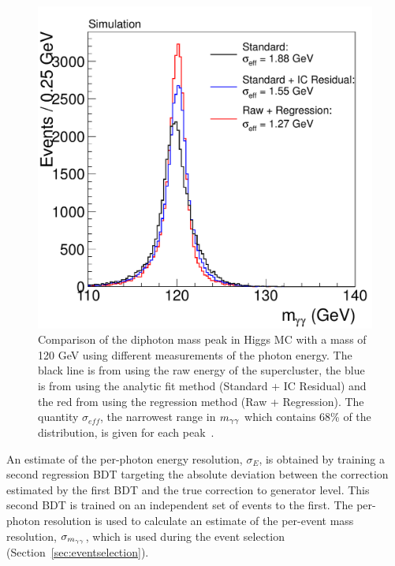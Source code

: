 \begin{figure}
\includegraphics[width=.6\textwidth]{hgg7TeV/generalPlots/regrresall.pdf}
\caption{Comparison of the diphoton mass peak in Higgs MC with a mass of 120 GeV using different 
measurements of the photon energy. The black line 
is from using the raw energy of the supercluster, the blue is from using the analytic fit method 
(Standard + IC Residual) 
and the red from using the regression method (Raw + Regression). The quantity $\sigma_{eff}$,
the narrowest range in $m_{\gamma\gamma}$ which contains 68\% of the distribution, is given for each peak~\citep{AN-12-048}.}
\label{fig:mcregrcomparison}
\end{figure}

An estimate of the per-photon energy resolution, $\sigma_{E}$, is obtained by training a second 
regression BDT targeting the absolute deviation between the correction estimated by the 
first BDT and the true correction to generator level. This second BDT is trained on an independent
set of events to the first. The per-photon resolution is used to calculate an estimate of the 
per-event mass resolution, $\sigma_{m_{\gamma\gamma}}$, which is used during the event selection 
(Section~\ref{sec:eventselection}). 

